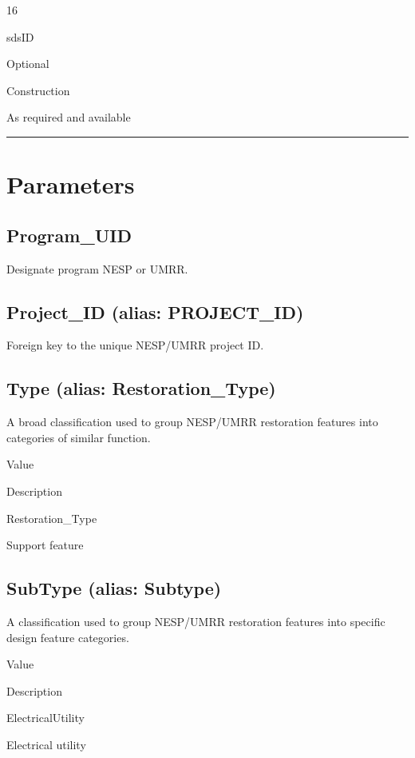 \documentclass[
  letterpaper,
  DIV=11,
  numbers=noendperiod]{scrreprt}
\begin{document}
16

sdsID

Optional

Construction

As required and available

\begin{center}\rule{0.5\linewidth}{0.5pt}\end{center}

\section{Parameters}\label{parameters-20}

\subsection{Program\_UID}\label{program_uid-20}

Designate program NESP or UMRR.

\subsection{Project\_ID (alias:
PROJECT\_ID)}\label{project_id-alias-project_id-20}

Foreign key to the unique NESP/UMRR project ID.

\subsection{Type (alias:
Restoration\_Type)}\label{type-alias-restoration_type-1}

A broad classification used to group NESP/UMRR restoration features into
categories of similar function.

Value

Description

Restoration\_Type

Support feature

\subsection{SubType (alias: Subtype)}\label{subtype-alias-subtype-20}

A classification used to group NESP/UMRR restoration features into
specific design feature categories.

Value

Description

ElectricalUtility

Electrical utility
\end{document}
